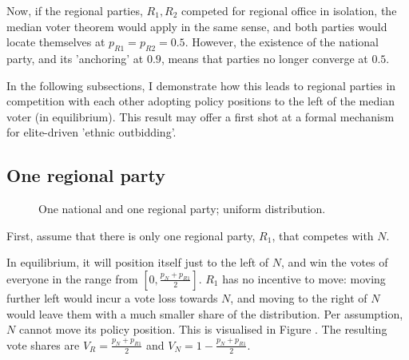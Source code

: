 \documentclass[11pt]{article}
\begin{document}
Now, if the regional parties, $R_1, R_2$ competed for regional office in isolation, the median voter theorem would apply in the same sense, and both parties would locate themselves at $p_{R1} = p_{R2} = 0.5$. However, the existence of the national party, and its 'anchoring' at $0.9$, means that parties no longer converge at $0.5$. 

In the following subsections, I demonstrate how this leads to regional parties in competition with each other adopting policy positions to the left of the median voter (in equilibrium). This result may offer a first shot at a formal mechanism for elite-driven 'ethnic outbidding'.

\subsection{One regional party}

\begin{figure}[ht]
    \centering 
     \caption{One national and one regional party; uniform distribution.} \label{fig:mod1}
 \end{figure}

 First, assume that there is only one regional party, $R_1$, that competes with $N$. 

 In equilibrium, it will position itself just to the left of $N$, and win the votes of everyone in the range from $[0, \frac{p_N + p_{R1}}{2}]$. $R_1$ has no incentive to move: moving further left would incur a vote loss towards $N$, and moving to the right of $N$ would leave them with a much smaller share of the distribution. Per assumption, $N$ cannot move its policy position. This is visualised in Figure \label{fig:mod1}. The resulting vote shares are $V_R = \frac{p_N + p_{R1}}{2}$ and $V_N = 1 - \frac{p_N + p_{R1}}{2}$.
\end{document}
